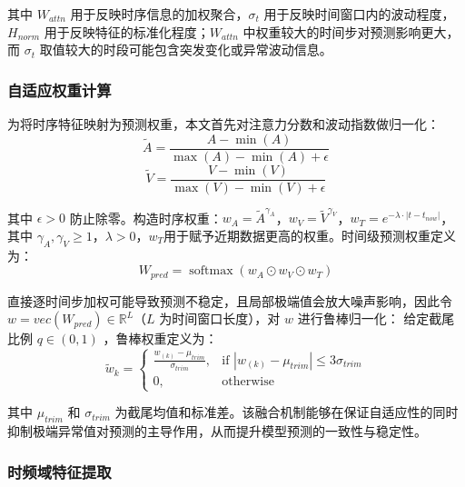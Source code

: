 \noindent 其中 \(W_{attn}\) 用于反映时序信息的加权聚合，\(\sigma_t\) 用于反映时间窗口内的波动程度，\(H_{norm}\) 用于反映特征的标准化程度；\(W_{attn}\) 中权重较大的时间步对预测影响更大，而 \(\sigma_t\) 取值较大的时段可能包含突发变化或异常波动信息。

\subsubsection{自适应权重计算}\label{subsec:ch3-adaptive-weight}

为将时序特征映射为预测权重，本文首先对注意力分数和波动指数做归一化：
\begin{equation}
\widetilde{A} = \frac{A - \min(A)}{\max(A) - \min(A) + \epsilon}
\tag{3-10}
\end{equation}
\begin{equation}
\widetilde{V} = \frac{V - \min(V)}{\max(V) - \min(V) + \epsilon}
\tag{3-11}
\end{equation}

其中 \(\epsilon > 0\)
防止除零。构造时序权重：\(w_{A} = {\widetilde{A}}^{\gamma_{A}}\)，\(w_{V} = {\widetilde{V}}^{\gamma_{V}}\)，\(w_{T} = e^{-\lambda \cdot |t-t_{now}|}\)，其中
\(\gamma_{A},\gamma_{V} \geq 1\)，\(\lambda > 0\)，\(w_{T}\)用于赋予近期数据更高的权重。时间级预测权重定义为：
\begin{equation}
W_{pred} = \operatorname{softmax}\left( w_{A} \odot w_{V} \odot w_{T} \right)
\tag{3-12}
\end{equation}

直接逐时间步加权可能导致预测不稳定，且局部极端值会放大噪声影响，因此令
\(w = vec(W_{pred}) \in \mathbb{R}^{L}\)（\(L\) 为时间窗口长度），对 \(w\) 进行鲁棒归一化：
给定截尾比例 \(q \in (0,1)\)
，鲁棒权重定义为：
\begin{equation}
\widetilde{w}_{k} = \begin{cases}
\frac{w_{(k)} - \mu_{trim}}{\sigma_{trim}}, & \text{if } |w_{(k)} - \mu_{trim}| \leq 3\sigma_{trim} \\
0, & \text{otherwise}
\end{cases}
\tag{3-13}
\end{equation}

其中 \(\mu_{trim}\) 和 \(\sigma_{trim}\) 为截尾均值和标准差。该融合机制能够在保证自适应性的同时抑制极端异常值对预测的主导作用，从而提升模型预测的一致性与稳定性。

\subsubsection{时频域特征提取}\label{subsec:ch3-freq-inject}

